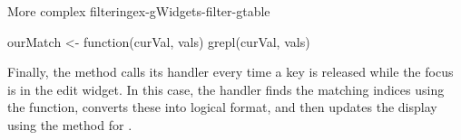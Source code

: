 \begin{example}{More complex filtering}{ex-gWidgets-filter-gtable}
\begin{Schunk}
\begin{Sinput}
 ourMatch <- function(curVal, vals) {
   grepl(curVal, vals)
 }
\end{Sinput}
\end{Schunk}

Finally, the  method calls its handler
every time a key is released while the focus is in the edit widget. In
this case, the handler finds the matching indices using the
 function, converts these into logical format, and then
updates the display using the  method for
  .
\begin{Schunk}
\end{Schunk}
\end{example}


